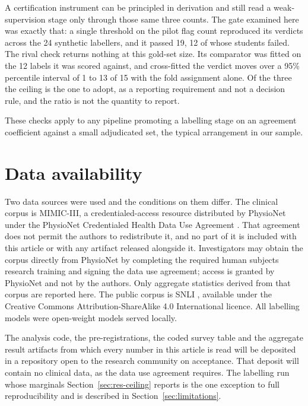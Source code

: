 \documentclass[review]{elsarticle}
\begin{document}
A certification instrument can be principled in derivation and still read a
weak-supervision stage only through those same three counts. The gate examined
here was exactly that: a single threshold on the pilot flag count reproduced its
verdicts across the 24 synthetic labellers, and it passed 19, 12 of whose
students failed. The rival check returns nothing at this gold-set size. Its
comparator was fitted on the 12 labels it was scored against, and cross-fitted
the verdict moves over a 95\% percentile interval of 1 to 13 of 15 with the
fold assignment alone. Of the three the ceiling is the one to adopt, as a reporting requirement
and not a decision rule, and the ratio is not the quantity to report.

These checks apply to any pipeline promoting a labelling stage on an agreement
coefficient against a small adjudicated set, the typical
arrangement in our sample.

\section*{Data availability}

Two data sources were used and the conditions on them differ. The clinical corpus
is MIMIC-III, a credentialed-access resource distributed by PhysioNet under the
PhysioNet Credentialed Health Data Use Agreement \cite{johnson2016mimic}. That
agreement does not permit the authors to redistribute it, and no part of it is
included with this article or with any artifact released alongside it.
Investigators may obtain the corpus directly from PhysioNet by completing the
required human subjects research training and signing the data use agreement;
access is granted by PhysioNet and not by the authors. Only aggregate statistics
derived from that corpus are reported here. The public corpus is SNLI
\cite{bowman2015snli}, available under the Creative Commons
Attribution-ShareAlike 4.0 International licence. All labelling models were
open-weight models served locally.

The analysis code, the pre-registrations, the coded survey table and the
aggregate result artifacts from which every number in this article is read will
be deposited in a repository open to the research community on acceptance. That
deposit will contain no clinical data, as the data use agreement requires. The
labelling run whose marginals Section~\ref{sec:res-ceiling} reports is the one
exception to full reproducibility and is described in Section~\ref{sec:limitations}.
\end{document}
